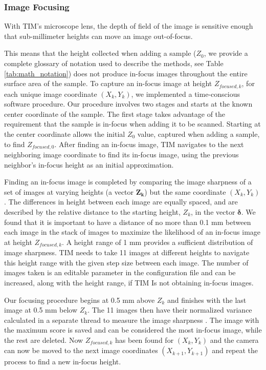 \documentclass[a4paper,12pt]{article}
\begin{document}
\subsubsection{Image Focusing}

With TIM's microscope lens, the depth of field of the image is sensitive enough that sub-millimeter heights can move an image out-of-focus.

This means that the height collected when adding a sample ($Z_0$, we provide a complete glossary of notation used to describe the methods, see Table \ref{tab:math_notation}) does not produce in-focus images throughout the entire surface area of the sample.
To capture an in-focus image at height $Z_{focused,k}$, for each unique image coordinate $(X_k, Y_k)$, we implemented a time-conscious software procedure. 
Our procedure involves two stages and starts at the known center coordinate of the sample.
The first stage takes advantage of the requirement that the sample is in-focus when adding it to be scanned.
Starting at the center coordinate allows the initial $Z_0$ value, captured when adding a sample, to find $Z_{focused,0}$. 
After finding an in-focus image, TIM navigates to the next neighboring image coordinate to find its in-focus image, using the previous neighbor's in-focus height as an initial approximation.

Finding an in-focus image is completed by comparing the image sharpness of a set of images at varying heights (a vector $\boldsymbol{Z_k}$) but the same coordinate $(X_k, Y_k)$. 
The differences in height between each image are equally spaced, and are described by the relative distance to the starting height, $Z_k$, in the vector $\boldsymbol{\delta}$. 
We found that it is important to have a distance of no more than 0.1 mm between each image in the stack of images to maximize the likelihood of an in-focus image at height $Z_{focused,k}$.
A height range of 1 mm provides a sufficient distribution of image sharpness. TIM needs to take 11 images at different heights to navigate this height range with the given step size between each image. The number of images taken is an editable parameter in the configuration file and can be increased, along with the height range, if TIM Is not obtaining in-focus images.

Our focusing procedure begins at 0.5 mm above $Z_k$ and finishes with the last image at 0.5 mm below $Z_k$.
The 11 images then have their normalized variance calculated in a separate thread to measure the image sharpness \citep{sampat_extensive_2014}.
The image with the maximum score is saved and can be considered the most in-focus image, while the rest are deleted. 
Now $Z_{focused,k}$ has been found for $(X_k, Y_k)$ and the camera can now be moved to the next image coordinates $(X_{k+1}, Y_{k+1})$ and repeat the process to find a new in-focus height.
\end{document}
